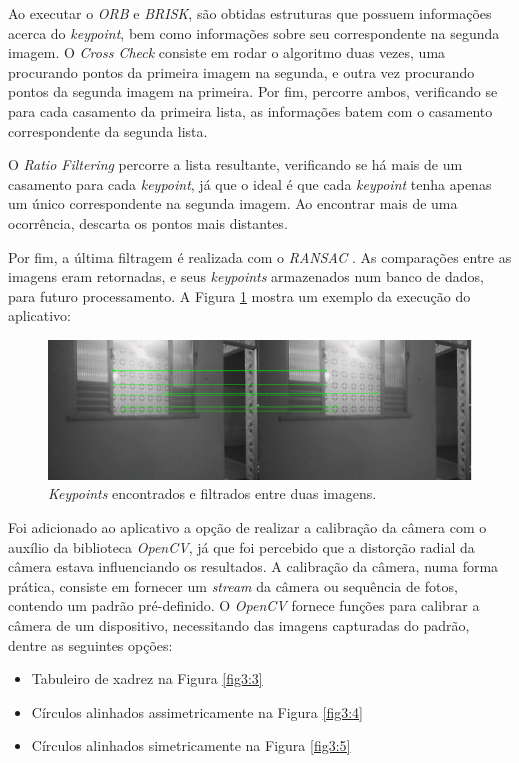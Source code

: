 Ao executar o \textit{ORB} e \textit{BRISK}, são obtidas estruturas que possuem informações acerca do \textit{keypoint}, bem como informações sobre seu correspondente na segunda imagem. O \textit{Cross Check} consiste em rodar o algoritmo duas vezes, uma procurando pontos da primeira imagem na segunda, e outra vez procurando pontos da segunda imagem na primeira. Por fim, percorre ambos, verificando se para cada casamento da primeira lista, as informações batem com o casamento correspondente da segunda lista.

O \textit{Ratio Filtering} percorre a lista resultante, verificando se há mais de um casamento para cada \textit{keypoint}, já que o ideal é que cada \textit{keypoint} tenha apenas um único correspondente na segunda imagem. Ao encontrar mais de uma ocorrência, descarta os pontos mais distantes.

Por fim, a última filtragem é realizada com o \textit{RANSAC} \cite{RANSAC}. As comparações entre as imagens eram retornadas, e seus \textit{keypoints} armazenados num banco de dados, para futuro processamento. A Figura \ref{fig3:2} mostra um exemplo da execução do aplicativo:

\begin{figure}[H]
	\centering
		\includegraphics[width= \textwidth]{Imagens/figura3-2E4-4.png}
	\caption{\textit{Keypoints} encontrados e filtrados entre duas imagens.}
	\label{fig3:2}
\end{figure}

 
Foi adicionado ao aplicativo a opção de realizar a calibração da câmera com o auxílio da biblioteca \textit{OpenCV}, já que foi percebido que a distorção radial da câmera estava influenciando os resultados. A calibração da câmera, numa forma prática, consiste em fornecer um \textit{stream} da câmera ou sequência de fotos, contendo um padrão pré-definido. O \textit{OpenCV} fornece funções para calibrar a câmera de um dispositivo, necessitando das imagens capturadas do padrão, dentre as seguintes opções:

\begin{itemize}
	\item{Tabuleiro de xadrez na Figura \ref{fig3:3}}
	\item{Círculos alinhados assimetricamente na Figura \ref{fig3:4}}
	\item{Círculos alinhados simetricamente na Figura \ref{fig3:5}}
\end{itemize}

